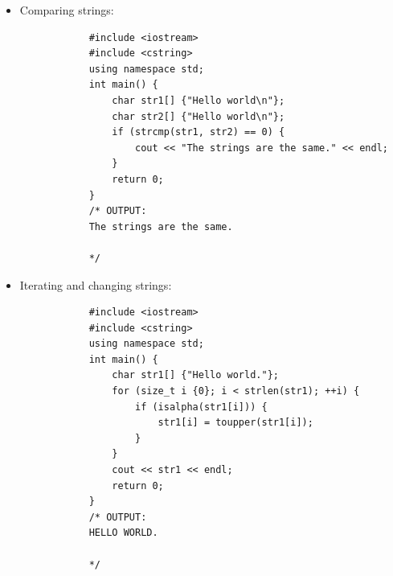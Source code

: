 \begin{itemize}
    \item Comparing strings:
        \begin{verbatim}
            #include <iostream>
            #include <cstring>
            using namespace std;
            int main() {
                char str1[] {"Hello world\n"};
                char str2[] {"Hello world\n"};
                if (strcmp(str1, str2) == 0) {
                    cout << "The strings are the same." << endl;
                }
                return 0;
            }
            /* OUTPUT:
            The strings are the same.

            */
        \end{verbatim}
    
    \item Iterating and changing strings:
        \begin{verbatim}
            #include <iostream>
            #include <cstring>
            using namespace std;
            int main() {
                char str1[] {"Hello world."};
                for (size_t i {0}; i < strlen(str1); ++i) {
                    if (isalpha(str1[i])) {
                        str1[i] = toupper(str1[i]);
                    }
                }
                cout << str1 << endl;
                return 0;
            }
            /* OUTPUT:
            HELLO WORLD.

            */
        \end{verbatim}
\end{itemize}


